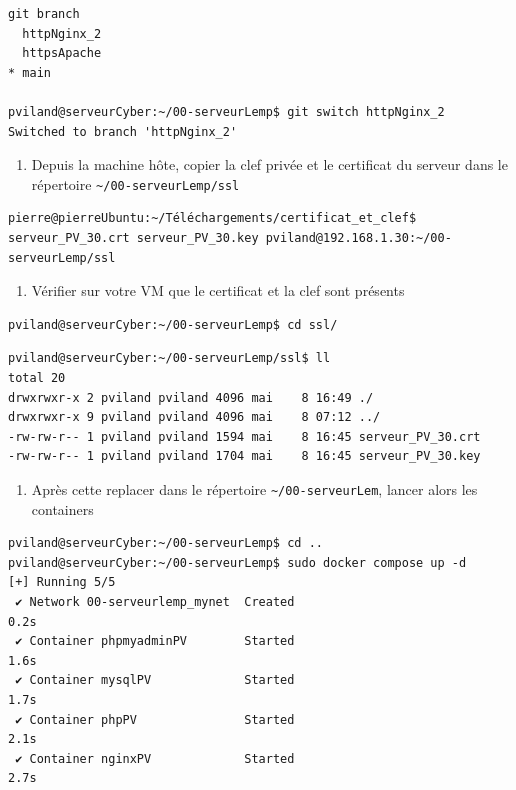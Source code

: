\documentclass[french, 12pt]{article}%
\begin{document}
\begin{lstlisting}[style=commande]
git branch
  httpNginx_2
  httpsApache
* main

pviland@serveurCyber:~/00-serveurLemp$ git switch httpNginx_2 
Switched to branch 'httpNginx_2'
\end{lstlisting}

\begin{enumerate}[resume]
\item Depuis la machine hôte, copier la clef privée et le certificat du serveur dans le répertoire \verb?~/00-serveurLemp/ssl?
\end{enumerate}


\begin{lstlisting}[style=commande]
pierre@pierreUbuntu:~/Téléchargements/certificat_et_clef$  serveur_PV_30.crt serveur_PV_30.key pviland@192.168.1.30:~/00-serveurLemp/ssl
\end{lstlisting}

\begin{enumerate}[resume]
\item Vérifier sur votre VM que le certificat et la clef sont présents
\end{enumerate}

\begin{lstlisting}[style=commande]
pviland@serveurCyber:~/00-serveurLemp$ cd ssl/
\end{lstlisting}

\begin{lstlisting}[style=commande]
pviland@serveurCyber:~/00-serveurLemp/ssl$ ll
total 20
drwxrwxr-x 2 pviland pviland 4096 mai    8 16:49 ./
drwxrwxr-x 9 pviland pviland 4096 mai    8 07:12 ../
-rw-rw-r-- 1 pviland pviland 1594 mai    8 16:45 serveur_PV_30.crt
-rw-rw-r-- 1 pviland pviland 1704 mai    8 16:45 serveur_PV_30.key
\end{lstlisting}

\begin{enumerate}[resume]
\item Après cette replacer dans le répertoire \verb?~/00-serveurLem?,  lancer alors les containers 
\end{enumerate}

\begin{lstlisting}[style=commande]
pviland@serveurCyber:~/00-serveurLemp$ cd ..
pviland@serveurCyber:~/00-serveurLemp$ sudo docker compose up -d
[+] Running 5/5
 ✔ Network 00-serveurlemp_mynet  Created                                   0.2s 
 ✔ Container phpmyadminPV        Started                                   1.6s 
 ✔ Container mysqlPV             Started                                   1.7s 
 ✔ Container phpPV               Started                                   2.1s 
 ✔ Container nginxPV             Started                                   2.7s 
\end{lstlisting}
\end{document}
